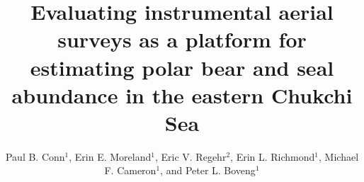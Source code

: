 \documentclass[]{rsos}%
\begin{document}
\title{Evaluating instrumental aerial surveys as a platform for estimating polar bear and seal abundance in the eastern Chukchi Sea}

\author{%
Paul B. Conn$^{1}$, Erin E. Moreland$^{1}$, Eric V. Regehr$^{2}$, Erin L. Richmond$^{1}$,  Michael F. Cameron$^{1}$, and Peter L. Boveng$^{1}$}

\address{$^{1}$National Marine Mammal Laboratory, NOAA-NMFS, Alaska Fisheries Science Center, 7600 Sand Point Way NE, Seattle, WA 98115 USA\\
$^{2}$U.S. Fish and Wildlife Service, Marine Mammals Management, 1011 East Tudor Road, Anchorage, Alaska 99503 USA\\}

\subject{statistics, ecology}




\maketitle
\end{document}
